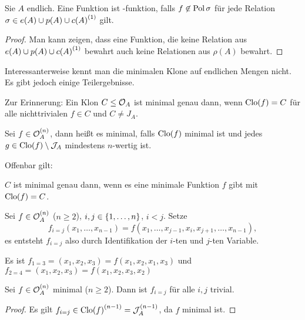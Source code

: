 \documentclass{book}
\begin{document}
\begin{proposition}
    Sie $A$ endlich. Eine Funktion ist -funktion, falls $f\not\in\mathop\mathrm{Pol}\sigma$ für jede Relation $\sigma\in e(A)\cup p(A)\cup {c(A)}^{(1)}$ gilt.
\end{proposition}

\begin{proof}
    Man kann zeigen, dass eine Funktion, die keine Relation aus $e(A)\cup p(A)\cup{c(A)}^{(1)}$ bewahrt auch keine Relationen aus $\rho(A)$ bewahrt.
\end{proof}

Interessanterweise kennt man die minimalen Klone auf endlichen Mengen nicht. Es gibt jedoch einige Teilergebnisse.

Zur Erinnerung: Ein Klon $C\leq \mathcal{O}_A$ ist minimal genau dann, wenn $\mathrm{Clo}(f)=C$ für alle nichttrivialen $f\in C$ und $C\neq J_A$.

\begin{definition}
    Sei $f\in\mathcal{O}_A^{(n)}$, dann heißt es minimal, falls $\mathrm{Clo}(f)$ minimal ist und jedes $g\in\mathrm{Clo}(f)\setminus \mathcal{J}_A$ mindestens $n$-wertig ist.
\end{definition}

Offenbar gilt:

\begin{remark}
    $C$ ist minimal genau dann, wenn es eine minimale Funktion $f$ gibt mit $\mathrm{Clo}(f)=C$.
\end{remark}

\begin{definition}
    Sei $f\in\mathcal{O}_A^{(n)}$ ($n\geq 2$), $i,j\in \left\{1,\ldots,n\right\}$, $i<j$. Setze
    $$
    f_{i=j}(x_1,\ldots,x_{n-1})=f(x_1,\ldots,x_{j-1},x_i,x_{j+1},\ldots,x_{n-1}),
    $$
    es entsteht $f_{i=j}$ also durch Identifikation der $i$-ten und $j$-ten Variable.
\end{definition}

\begin{example}
    Es ist $f_{1=3}=(x_1,x_2,x_3)=f(x_1,x_2,x_1,x_3)$ und
    $f_{2=4}=(x_1,x_2,x_3)=f(x_1,x_2,x_3,x_2)$
\end{example}

\begin{proposition}
    Sei $f\in\mathcal{O}_A^{(n)}$ minimal ($n\geq 2$). Dann ist $f_{i=j}$ für alle $i,j$ trivial.
\end{proposition}

\begin{proof}
    Es gilt $f_{i=j}\in{\mathrm{Clo}(f)}^{(n-1)}=\mathcal{J}_A^{(n-1)}$, da $f$ minimal ist.
\end{proof}
\end{document}
